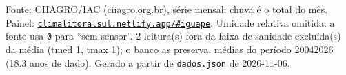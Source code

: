 \documentclass[10pt,a4paper]{article}
\begin{document}
\vspace{1pt}
{\tiny\color{cinza}
Fonte: CIIAGRO/IAC (\href{http://ciiagro.org.br}{ciiagro.org.br}), série mensal;
chuva é o total do mês. Painel:
\href{https://climalitoralsul.netlify.app/\#iguape}%
{\texttt{climalitoralsul.netlify.app/\#iguape}}.
Umidade relativa omitida: a fonte usa \texttt{0} para ``sem sensor''.  2 leitura(s) fora da faixa de sanidade excluída(s) da média (tmed 1, tmax 1); o banco as preserva.
médias do período 2004\textendash{}2026 (18.3 anos de dado).
Gerado a partir de \texttt{dados.json} de 2026-11-06.}
\end{document}
